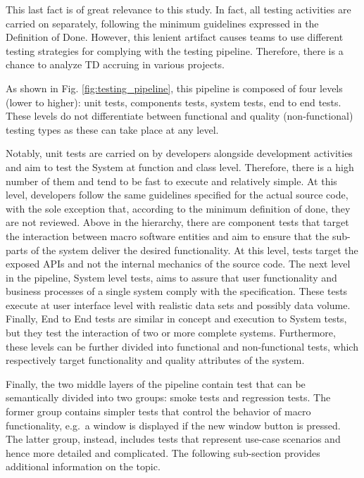 This last fact is of great relevance to this study. In fact, all testing activities are carried on separately, following the minimum guidelines expressed in the Definition of Done. However, this lenient artifact causes teams to use different testing strategies for complying with the testing pipeline. Therefore, there is a chance to analyze TD accruing in various projects. 

As shown in Fig. \ref{fig:testing_pipeline}, this pipeline is composed of four levels (lower to higher): unit tests, components tests, system tests, end to end tests. These levels do not differentiate between functional and quality (non-functional) testing types as these can take place at any level. 

Notably, unit tests are carried on by developers alongside development activities and aim to test the System at function and class level. Therefore, there is a high number of them and tend to be fast to execute and relatively simple. At this level, developers follow the same guidelines specified for the actual source code, with the sole exception that, according to the minimum definition of done, they are not reviewed. Above in the hierarchy, there are component tests that target the interaction between macro software entities and aim to ensure that the sub-parts of the system deliver the desired functionality. At this level, tests target the exposed APIs and not the internal mechanics of the source code. The next level in the pipeline, System level tests, aims to assure that user functionality and business processes of a single system comply with the specification. These tests execute at user interface level with realistic data sets and possibly data volume. Finally, End to End tests are similar in concept and execution to System tests, but they test the interaction of two or more complete systems. Furthermore, these levels can be further divided into functional and non-functional tests, which respectively target functionality and quality attributes of the system.

Finally, the two middle layers of the pipeline contain test that can be semantically divided into two groups: smoke tests and regression tests. The former group contains simpler tests that control the behavior of macro functionality, e.g.\ a window is displayed if the new window button is pressed. The latter group, instead, includes tests that represent use-case scenarios and hence more detailed and complicated. The following sub-section provides additional information on the topic.

